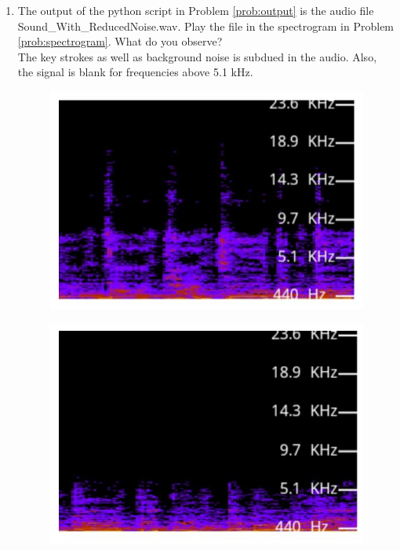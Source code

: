 \documentclass[journal,12pt,twocolumn]{IEEEtran}
\theoremstyle{remark}
\begin{document}
\begin{enumerate}[label=\thesection.\arabic*
,ref=\thesection.\theenumi]
%
\item
The output of the python script in Problem \ref{prob:output} is the audio file Sound\_With\_ReducedNoise.wav. Play the file in the spectrogram in Problem \ref{prob:spectrogram}. What do you observe?
\\
\solution The key strokes as well as background noise is subdued in the audio.  Also,  the signal is blank for frequencies above 5.1 kHz.
\begin{figure}[!ht]
\begin{center}
\includegraphics[width=\columnwidth]{Waveform.jpg}
\end{center}
\end{figure}
\begin{figure}[!ht]
\begin{center}
\includegraphics[width=\columnwidth]{Filtered_waveform.jpg}
\end{center}
\label{fig:xnyn}	
\end{figure}
\end{enumerate}
\end{document}

